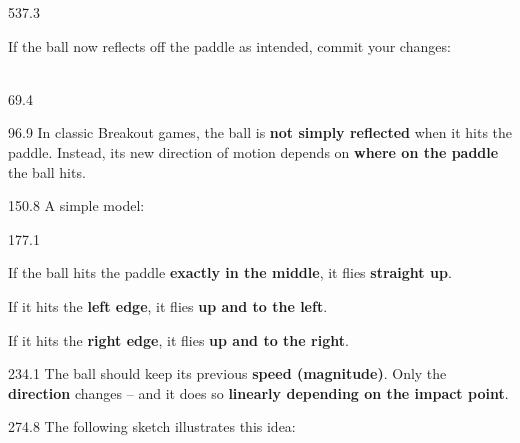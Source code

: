 \documentclass{aslab}
\begin{document}
\begin{region}[pitch=13.45]{537.3}
\begin{ntasks}[start=2]
\item If the ball now reflects off the paddle as intended, commit your
  changes:\\
  \\
\end{ntasks}
\end{region}

\nextpage
\begin{region}{69.4}
\end{region}

\begin{region}[pitch=13.8]{96.9}
In classic Breakout games, the ball is \textbf{not simply reflected} when it
hits the paddle. Instead, its new direction of motion depends on \textbf{where
on the paddle} the ball hits.
\end{region}

\begin{region}{150.8}
A simple model:
\end{region}

\begin{region}[pitch=14.3]{177.1}
\begin{dashlist}
\item If the ball hits the paddle \textbf{exactly in the middle}, it flies
  \textbf{straight up}.
\item If it hits the \textbf{left edge}, it flies \textbf{up and to the
  left}.
\item If it hits the \textbf{right edge}, it flies \textbf{up and to the
  right}.
\end{dashlist}
\end{region}

\begin{region}[pitch=14.2]{234.1}
The ball should keep its previous \textbf{speed (magnitude)}. Only the
\textbf{direction} changes -- and it does so \textbf{linearly depending on the
impact point}.
\end{region}

\begin{region}{274.8}
The following sketch illustrates this idea:
\end{region}

\end{document}
